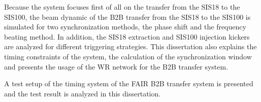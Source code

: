 Because the system focuses first of all on the transfer from the SIS18 to the SIS100, the beam dynamic of the B2B transfer from the SIS18 to the SIS100 is simulated for two synchronization methods, the phase shift and the frequency beating method. In addition, the SIS18 extraction and SIS100 injection kickers are analyzed for different triggering strategies. This dissertation also explains the timing constraints of the system, the calculation of the synchronization window and presents the usage of the WR network for the B2B transfer system. 

A test setup of the timing system of the FAIR B2B transfer system is presented and the test result is analyzed in this dissertation. 
